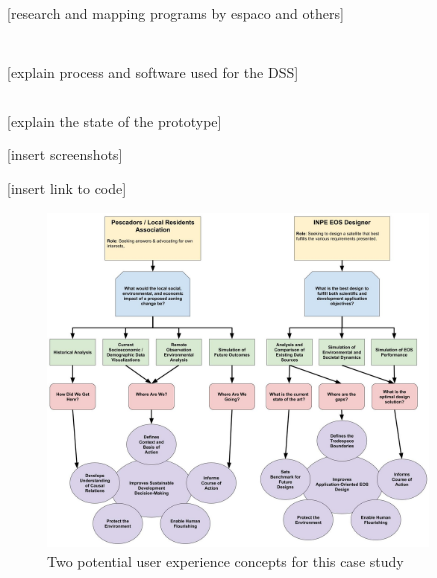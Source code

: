 [research and mapping programs by espaco and others]

\section{} \label{sec:rio-dss}

\subsection{}

[explain process and software used for the DSS]

\subsection{} \label{sec:rio-dss-results}

[explain the state of the prototype]

[insert screenshots]

[insert link to code]

\begin{figure}[t] 
\centering
\includegraphics[width=0.9\textwidth]{Figures/chap4/concept_flow.jpg}
\caption[Two potential user experience concepts for the Rio de Janeiro case study]{Two potential user experience concepts for this case study}
\label{fig:concept_flow}
\end{figure}

\section{} \label{sec:rio-collab}


